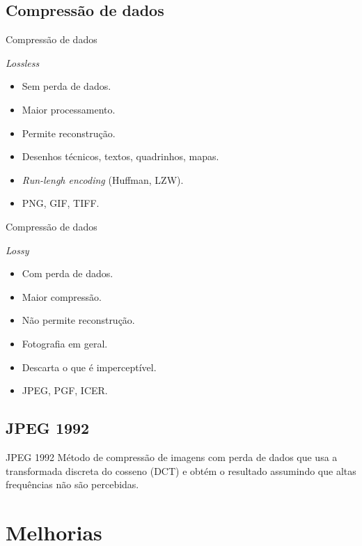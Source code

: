 \documentclass{beamer}
\begin{document}
\subsection{Compressão de dados}
\begin{frame}{Compressão de dados}
   \begin{block}{\textit{Lossless}}
      \begin{itemize}
         \item Sem perda de dados.
         \item Maior processamento.
         \item Permite reconstrução.
         \item Desenhos técnicos, textos, quadrinhos, mapas.
         \item \emph{Run-lengh encoding} (Huffman, LZW).
         \item PNG, GIF, TIFF.
      \end{itemize}
   \end{block}
\end{frame}
\begin{frame}{Compressão de dados}
   \begin{block}{\textit{Lossy}}
      \begin{itemize}
         \item Com perda de dados.
         \item Maior compressão.
         \item Não permite reconstrução.
         \item Fotografia em geral.
         \item Descarta o que é imperceptível.
         \item JPEG, PGF, ICER.
      \end{itemize}
   \end{block}
\end{frame}
\subsection{JPEG 1992}
\begin{frame}{JPEG 1992}
   Método de compressão de imagens com perda de dados que usa a transformada discreta do cosseno (DCT) e obtém o resultado assumindo que altas frequências não são percebidas.
\end{frame}

\section{Melhorias}
\end{document}
